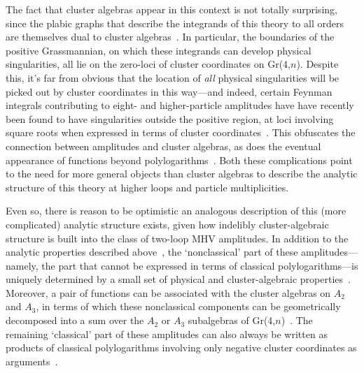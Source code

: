 \documentclass[11pt]{article}
\begin{document}
The fact that cluster algebras appear in this context is not totally surprising, since the plabic graphs that describe the integrands of this theory to all orders are themselves dual to cluster algebras~\cite{ArkaniHamed:2012nw}. In particular, the boundaries of the positive Grassmannian, on which these integrands can develop physical singularities, all lie on the zero-loci of cluster coordinates on Gr(4,$n$). Despite this, it's far from obvious that the location of \emph{all} physical singularities will be picked out by cluster coordinates in this way---and indeed, certain Feynman integrals contributing to eight- and higher-particle amplitudes have have recently been found to have singularities outside the positive region, at loci involving square roots when expressed in terms of cluster coordinates~\cite{Prlina:2017azl,Bourjaily:2018aeq,Henn:2018cdp}. This obfuscates the connection between amplitudes and cluster algebras, as does the eventual appearance of functions beyond polylogarithms~\cite{}. Both these complications point to the need for more general objects than cluster algebras to describe the analytic structure of this theory at higher loops and particle multiplicities.

Even so, there is reason to be optimistic an analogous description of this (more complicated) analytic structure exists, given how indelibly cluster-algebraic structure is built into the class of two-loop MHV amplitudes. In addition to the analytic properties described above~\cite{Golden:2013xva,Golden:2013lha,Golden:2014xqa,Golden:2014pua}, the `nonclassical' part of these amplitudes---namely, the part that cannot be expressed in terms of classical polylogarithms---is uniquely determined by a small set of physical and cluster-algebraic properties~\cite{Golden:2014pua}.  Moreover, a pair of functions can be associated with the cluster algebras on $A_2$ and $A_3$, in terms of which these nonclassical components can be geometrically decomposed into a sum over the $A_2$ or $A_3$ subalgebras of Gr(4,$n$)~\cite{Golden:2014xqa}. The remaining `classical' part of these amplitudes can also always be written as products of classical polylogarithms involving only negative cluster coordinates as arguments~\cite{Golden:2014xqf}.
\end{document}
